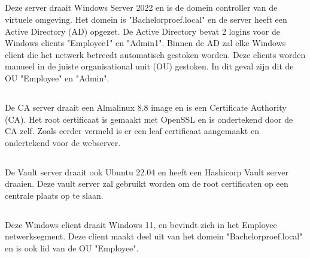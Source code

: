 \subsection{}
\label{subsec:Windows_server}

Deze server draait Windows Server 2022 en is de domein controller van de virtuele omgeving. Het domein is "Bachelorproef.local" en de server heeft een Active Directory (AD) opgezet. De Active Directory bevat 2 logins voor de Windows clients "Employee1" en "Admin1". Binnen de AD zal elke Windows client die het netwerk betreedt automatisch gestoken worden. 
Deze clients worden manueel in de juiste organisational unit (OU) gestoken. In dit geval zijn dit de OU "Employee" en "Admin".

\subsection{}
\label{subsec:CA}

De CA server draait een Almalinux 8.8 image en is een Certificate Authority (CA). Het root certificaat is gemaakt met OpenSSL en is ondertekend door de CA zelf. Zoals eerder vermeld is er een leaf certificaat aangemaakt en ondertekend voor de webserver.

\subsection{}
\label{subsec:Vault}

De Vault server draait ook Ubuntu 22.04 en heeft een Hashicorp Vault server draaien. Deze vault server zal gebruikt worden om de root certificaten op een centrale plaats op te slaan.

\subsection{}
\label{subsec:Employee-client}

Deze Windows client draait Windows 11, en bevindt zich in het Employee netwerksegment. Deze client maakt deel uit van het domein "Bachelorproef.local" en is ook lid van de OU "Employee".

\subsection{}
\label{subsec:Admin-client}

